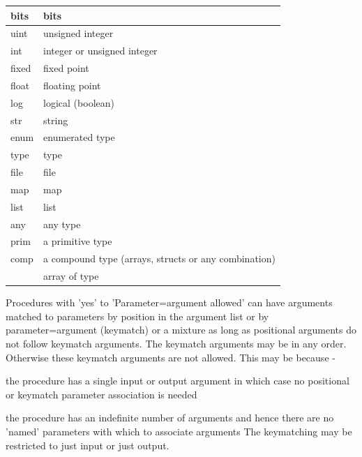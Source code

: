     \begin{tabular}{| l | l |}
    \hline
    bits  & bits                                                    \\ \hline
    uint  & unsigned integer                                        \\ \hline
    int   & integer or unsigned integer                             \\ \hline
    fixed & fixed point                                             \\ \hline
    float & floating point                                          \\ \hline
    log   & logical (boolean)                                       \\ \hline
    str   & string                                                  \\ \hline
    enum  & enumerated type                                         \\ \hline
    type  & type                                                    \\ \hline
    file  & file                                                    \\ \hline
    map   & map                                                     \\ \hline
    list  & list                                                    \\ \hline
    any   & any type                                                \\ \hline
    prim  & a primitive type                                        \\ \hline
    comp  & a compound type (arrays, structs or any combination)    \\ \hline
    []    & array of type                                           \\ \hline
    \end{tabular}

    Procedures with 'yes' to 'Parameter=argument allowed' can have arguments
    matched to parameters by position in the argument list or by
    parameter=argument (keymatch) or a mixture as long as positional arguments
    do not follow keymatch arguments. The keymatch arguments may be in
    any order. Otherwise these keymatch arguments are
    not allowed. This may be because - \\
    \blist
    \item   the procedure has a single input or output argument in which case
    no positional or keymatch parameter association is needed
    \item   the procedure has an indefinite number of arguments and hence there
    are no 'named' parameters with which to associate arguments
    \blend
    The keymatching may be restricted to just input or just output.

